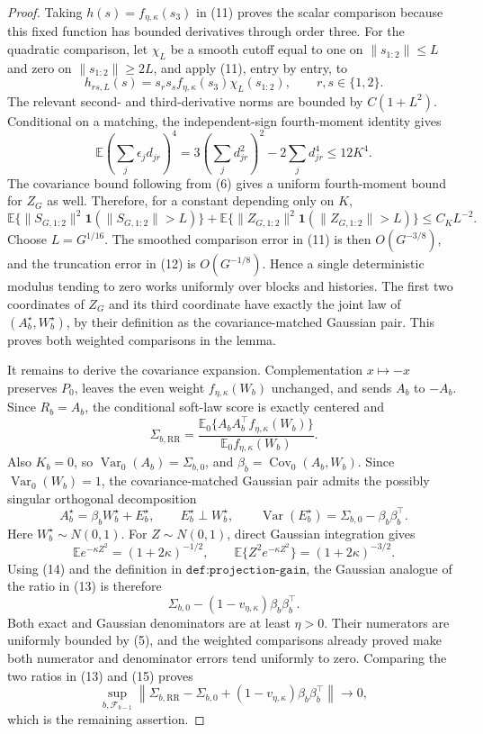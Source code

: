 \documentclass{article}
\begin{document}
\begin{proof}
Taking \(h(s)=f_{\eta,\kappa}(s_3)\) in (11) proves the scalar comparison because this fixed function has bounded derivatives through order three.  For the quadratic comparison, let \(\chi_L\) be a smooth cutoff equal to one on \(\|s_{1:2}\|\leq L\) and zero on \(\|s_{1:2}\|\geq2L\), and apply (11), entry by entry, to
\[
h_{rs,L}(s)=s_rs_s f_{\eta,\kappa}(s_3)\chi_L(s_{1:2}),
\qquad r,s\in\{1,2\}.
\]
The relevant second- and third-derivative norms are bounded by \(C(1+L^2)\).  Conditional on a matching, the independent-sign fourth-moment identity gives
\[
\mathbb E\left(\sum_j\epsilon_jd_{jr}\right)^4
=3\left(\sum_jd_{jr}^2\right)^2-2\sum_jd_{jr}^4
\leq12K^4.
\]
The covariance bound following from (6) gives a uniform fourth-moment bound for \(Z_G\) as well.  Therefore, for a constant depending only on \(K\),
\[
\mathbb E\{\|S_{G,1:2}\|^2\mathbf1(\|S_{G,1:2}\|>L)\}
+\mathbb E\{\|Z_{G,1:2}\|^2\mathbf1(\|Z_{G,1:2}\|>L)\}
\leq C_KL^{-2}.                                           \tag{12}
\]
Choose \(L=G^{1/16}\).  The smoothed comparison error in (11) is then \(O(G^{-3/8})\), and the truncation error in (12) is \(O(G^{-1/8})\).  Hence a single deterministic modulus tending to zero works uniformly over blocks and histories.  The first two coordinates of \(Z_G\) and its third coordinate have exactly the joint law of \((A_b^\star,W_b^\star)\), by their definition as the covariance-matched Gaussian pair.  This proves both weighted comparisons in the lemma.

It remains to derive the covariance expansion.  Complementation \(x\mapsto-x\) preserves \(P_0\), leaves the even weight \(f_{\eta,\kappa}(W_b)\) unchanged, and sends \(A_b\) to \(-A_b\).  Since \(R_b=A_b\), the conditional soft-law score is exactly centered and
\[
\Sigma_{b,\mathrm{RR}}
=\frac{\mathbb E_0\{A_bA_b^\top f_{\eta,\kappa}(W_b)\}}
       {\mathbb E_0f_{\eta,\kappa}(W_b)}.                \tag{13}
\]
Also \(K_b=0\), so \(\operatorname{Var}_0(A_b)=\Sigma_{b,0}\), and \(\beta_b=\operatorname{Cov}_0(A_b,W_b)\).  Since \(\operatorname{Var}_0(W_b)=1\), the covariance-matched Gaussian pair admits the possibly singular orthogonal decomposition
\[
A_b^\star=\beta_bW_b^\star+E_b^\star,
\qquad
E_b^\star\perp W_b^\star,
\qquad
\operatorname{Var}(E_b^\star)=\Sigma_{b,0}-\beta_b\beta_b^\top. \tag{14}
\]
Here \(W_b^\star\sim N(0,1)\).  For \(Z\sim N(0,1)\), direct Gaussian integration gives
\[
\mathbb Ee^{-\kappa Z^2}=(1+2\kappa)^{-1/2},
\qquad
\mathbb E\{Z^2e^{-\kappa Z^2}\}=(1+2\kappa)^{-3/2}.
\]
Using (14) and the definition in \(\texttt{def:projection-gain}\), the Gaussian analogue of the ratio in (13) is therefore
\[
\Sigma_{b,0}-(1-v_{\eta,\kappa})\beta_b\beta_b^\top.     \tag{15}
\]
Both exact and Gaussian denominators are at least \(\eta>0\).  Their numerators are uniformly bounded by (5), and the weighted comparisons already proved make both numerator and denominator errors tend uniformly to zero.  Comparing the two ratios in (13) and (15) proves
\[
\sup_{b,\mathcal F_{b-1}}
\left\|\Sigma_{b,\mathrm{RR}}-\Sigma_{b,0}
 +(1-v_{\eta,\kappa})\beta_b\beta_b^\top\right\|\longrightarrow0,
\]
which is the remaining assertion.
\end{proof}
\end{document}
